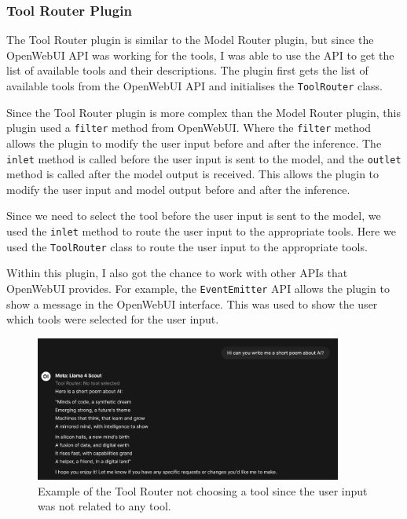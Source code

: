\subsubsection{Tool Router Plugin}

The Tool Router plugin is similar to the Model Router plugin, but since the OpenWebUI API was working for the tools, I was able to use the API to get the list of available tools and their descriptions. The plugin first gets the list of available tools from the OpenWebUI API and initialises the \texttt{ToolRouter} class.

Since the Tool Router plugin is more complex than the Model Router plugin, this plugin used a \texttt{filter} method from OpenWebUI. Where the \texttt{filter} method allows the plugin to modify the user input before and after the inference. The \texttt{inlet} method is called before the user input is sent to the model, and the \texttt{outlet} method is called after the model output is received. This allows the plugin to modify the user input and model output before and after the inference.

Since we need to select the tool before the user input is sent to the model, we used the \texttt{inlet} method to route the user input to the appropriate tools. Here we used the \texttt{ToolRouter} class to route the user input to the appropriate tools.

Within this plugin, I also got the chance to work with other APIs that OpenWebUI provides. For example, the \texttt{EventEmitter} API allows the plugin to show a message in the OpenWebUI interface. This was used to show the user which tools were selected for the user input.

\begin{figure}[H]
    \centering
    \includegraphics[width=0.9\textwidth]{figures/owui-tool-demo-0.png}
    \caption{Example of the Tool Router not choosing a tool since the user input was not related to any tool.}
    \label{fig:tool_router_plugin_demo_0}
\end{figure}


